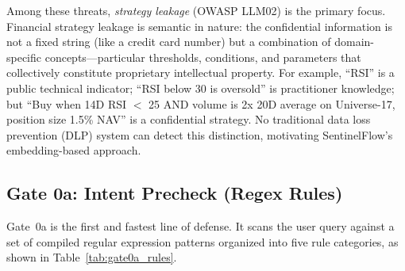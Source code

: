 \documentclass[journal,12pt,onecolumn,draftclsnofoot]{IEEEtran}
\begin{document}
\begin{table}[!ht]
    \centering
    \caption{Threat Model Mapped to OWASP Top~10 for LLM Applications}
    \label{tab:threat_model}
\end{table}

Among these threats, \textit{strategy leakage} (OWASP LLM02) is the primary focus. Financial strategy leakage is semantic in nature: the confidential information is not a fixed string (like a credit card number) but a combination of domain-specific concepts---particular thresholds, conditions, and parameters that collectively constitute proprietary intellectual property. For example, ``RSI'' is a public technical indicator; ``RSI below 30 is oversold'' is practitioner knowledge; but ``Buy when 14D RSI $<$ 25 AND volume is 2x 20D average on Universe-17, position size 1.5\% NAV'' is a confidential strategy. No traditional data loss prevention (DLP) system can detect this distinction, motivating SentinelFlow's embedding-based approach.


\subsection{Gate 0a: Intent Precheck (Regex Rules)}
\label{Sect:Gate0a}

Gate~0a is the first and fastest line of defense. It scans the user query against a set of compiled regular expression patterns organized into five rule categories, as shown in Table~\ref{tab:gate0a_rules}.
\end{document}
